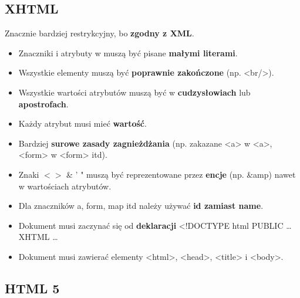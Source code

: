 \documentclass[../main.tex]{subfiles}
\begin{document}
    \subsection{XHTML}
    Znacznie bardziej restrykcyjny, bo \textbf{zgodny z XML}.
    \begin{itemize}
        \item Znaczniki i atrybuty w muszą być pisane \textbf{małymi literami}.
        \item Wszystkie elementy muszą być \textbf{poprawnie zakończone} (np. <br/>).
        \item Wszystkie wartości atrybutów muszą być w \textbf{cudzysłowiach} lub \textbf{apostrofach}.
        \item Każdy atrybut musi mieć \textbf{wartość}.
        \item Bardziej \textbf{surowe zasady zagnieżdżania} (np. zakazane <a> w <a>, <form> w <form> itd).
        \item Znaki $< >$ \& ' " muszą być reprezentowane przez \textbf{encje} (np. \&amp) nawet w wartościach atrybutów.
        \item Dla znaczników a, form, map itd należy używać \textbf{id zamiast name}.
        \item Dokument musi zaczynać się od \textbf{deklaracji} <!DOCTYPE html PUBLIC \dots XHTML \dots
        \item Dokument musi zawierać elementy <html>, <head>, <title> i <body>.
    \end{itemize}

    \subsection{HTML 5}
\end{document}
